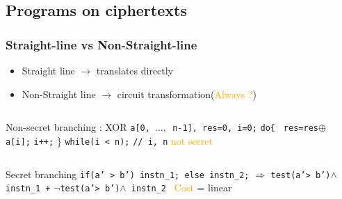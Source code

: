 \documentclass{beamer}
\begin{document}
\subsection{Programs on ciphertexts}


\begin{frame} \frametitle{ Straight-line vs Non-Straight-line}
  \begin{itemize}
  \item Straight line $\rightarrow$ translates directly
  \item Non-Straight line $\rightarrow$ circuit transformation(\textcolor{orange}{Always ?})
  \end{itemize}

\begin{columns}
\begin{column}[c]{9cm}
\begin{exampleblock}{Non-secret branching : XOR}
\texttt{a[0, $\ldots,$ n-1], res=0, i=0;}
\newline \phantom{x} \texttt{do\{ }
\newline \phantom{x} \hspace{9ex} \texttt{res=res$\oplus$a[i];}
\newline \phantom{x} \hspace{9ex} \texttt{i++;} 
\newline   \phantom{x} \} \texttt{while(i < n);} \phantom{x} \hspace{9ex}\texttt{// i, n} \textcolor{orange}{not secret}
\end{exampleblock}
\end{column}
\begin{column}[c]{2cm}

\end{column}
\end{columns} 
\begin{alertblock}{Secret branching}
\texttt{if(a' > b') instn\_1; else instn\_2;}
\newline   \phantom{x}  \hspace{8ex} $\Rightarrow$ \texttt{test(a'> b')$\wedge$} \texttt{instn\_1 +} $\neg$\texttt{test(a'> b')$\wedge$ instn\_2 }
\newline \textcolor{orange}{Cost} = linear
\end{alertblock}
\end{frame}
\end{document}
